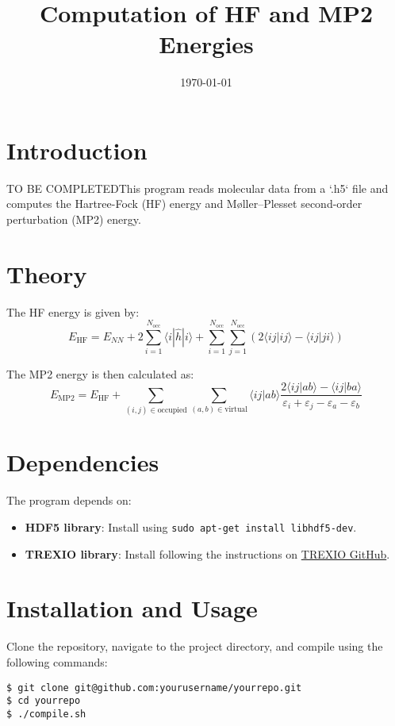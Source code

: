 \documentclass{article}
\begin{document}
\title{Computation of HF and MP2 Energies}
\date{\today}
\maketitle

\section*{Introduction}
TO BE COMPLETEDThis program reads molecular data from a `.h5` file and computes the Hartree-Fock (HF) energy and Møller–Plesset second-order perturbation (MP2) energy.

\section*{Theory}
The HF energy is given by:
\begin{equation}
E_{\text{HF}} = E_{NN} + 2\sum_{i=1}^{N_{\text{occ}}}\langle i|\hat{h}|i\rangle + \sum_{i=1}^{N_{\text{occ}}}\sum_{j=1}^{N_{\text{occ}}} \left(2\langle ij|ij\rangle - \langle ij|ji\rangle\right)
\end{equation}

The MP2 energy is then calculated as:
\begin{equation}
E_{\text{MP2}} = E_{\text{HF}} + 
\sum_{(i,j)\in\text{occupied}}\sum_{(a,b)\in\text{virtual}}\langle ij|ab\rangle\frac{2\langle ij|ab\rangle-\langle ij|ba\rangle}{\varepsilon_i+\varepsilon_j-\varepsilon_a-\varepsilon_b}
\end{equation}

\section*{Dependencies}
The program depends on:
\begin{itemize}
    \item \textbf{HDF5 library}: Install using \texttt{sudo apt-get install libhdf5-dev}.
    \item \textbf{TREXIO library}: Install following the instructions on \href{https://github.com/TREX-CoE/trexio}{TREXIO GitHub}.
\end{itemize}

\section*{Installation and Usage}
Clone the repository, navigate to the project directory, and compile using the following commands:
\begin{verbatim}
$ git clone git@github.com:yourusername/yourrepo.git
$ cd yourrepo
$ ./compile.sh
\end{verbatim}
\end{document}
